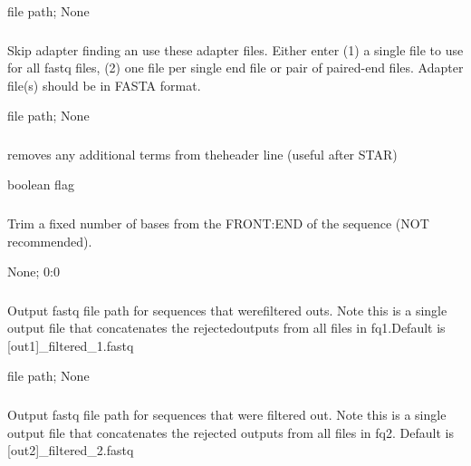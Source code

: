 \documentclass[letterpaper,11pt,english]{sphinxmanual}
\begin{document}
 file path;  None


\subsubsection{}
\label{\detokenize{prog_desc:a-adapters}}
 Skip adapter finding an use these adapter files. Either enter (1) a single  file to use for all fastq files, (2)  one file per single end file or pair  of paired-end files. Adapter file(s) should be in FASTA format.

 file path;  None


\subsubsection{}
\label{\detokenize{prog_desc:clean-header}}
 removes any additional terms from theheader line (useful after STAR)

 boolean flag


\subsubsection{}
\label{\detokenize{prog_desc:f-trim-fixed}}
 Trim a fixed number of bases from the FRONT:END of the sequence (NOT recommended).

 None;  0:0


\subsubsection{}
\label{\detokenize{prog_desc:filt1}}
 Output fastq file path for sequences that werefiltered outs. Note this is a single output file that concatenates the rejectedoutputs from all files in \textendash{}fq1.Default is {[}\textendash{}out1{]}\_filtered\_1.fastq

 file path;  None


\subsubsection{}
\label{\detokenize{prog_desc:filt2}}
 Output fastq file path for sequences that were filtered out. Note this is a single output file that concatenates the rejected outputs from all files in \textendash{}fq2. Default is {[}\textendash{}out2{]}\_filtered\_2.fastq
\end{document}
